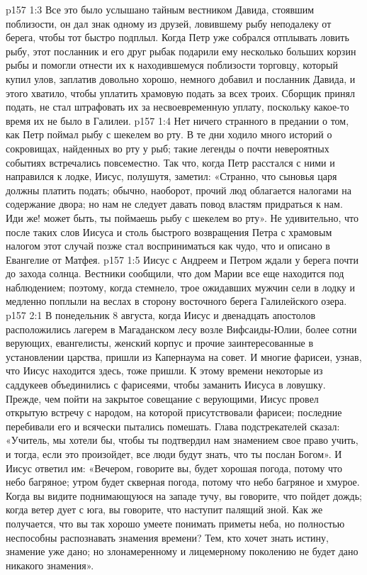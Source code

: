 \vs p157 1:3 Все это было услышано тайным вестником Давида, стоявшим поблизости, он дал знак одному из друзей, ловившему рыбу неподалеку от берега, чтобы тот быстро подплыл. Когда Петр уже собрался отплывать ловить рыбу, этот посланник и его друг рыбак подарили ему несколько больших корзин рыбы и помогли отнести их к находившемуся поблизости торговцу, который купил улов, заплатив довольно хорошо, немного добавил и посланник Давида, и этого хватило, чтобы уплатить храмовую подать за всех троих. Сборщик принял подать, не стал штрафовать их за несвоевременную уплату, поскольку какое\hyp{}то время их не было в Галилеи.
\vs p157 1:4 Нет ничего странного в предании о том, как Петр поймал рыбу с шекелем во рту. В те дни ходило много историй о сокровищах, найденных во рту у рыб; такие легенды о почти невероятных событиях встречались повсеместно. Так что, когда Петр расстался с ними и направился к лодке, Иисус, полушутя, заметил: «Странно, что сыновья царя должны платить подать; обычно, наоборот, прочий люд облагается налогами на содержание двора; но нам не следует давать повод властям придраться к нам. Иди же! может быть, ты поймаешь рыбу с шекелем во рту». Не удивительно, что после таких слов Иисуса и столь быстрого возвращения Петра с храмовым налогом этот случай позже стал восприниматься как чудо, что и описано в Евангелие от Матфея.
\vs p157 1:5 Иисус с Андреем и Петром ждали у берега почти до захода солнца. Вестники сообщили, что дом Марии все еще находится под наблюдением; поэтому, когда стемнело, трое ожидавших мужчин сели в лодку и медленно поплыли на веслах в сторону восточного берега Галилейского озера.
\vs p157 2:1 В понедельник 8 августа, когда Иисус и двенадцать апостолов расположились лагерем в Магаданском лесу возле Вифсаиды\hyp{}Юлии, более сотни верующих, евангелисты, женский корпус и прочие заинтересованные в установлении царства, пришли из Капернаума на совет. И многие фарисеи, узнав, что Иисус находится здесь, тоже пришли. К этому времени некоторые из саддукеев объединились с фарисеями, чтобы заманить Иисуса в ловушку. Прежде, чем пойти на закрытое совещание с верующими, Иисус провел открытую встречу с народом, на которой присутствовали фарисеи; последние перебивали его и всячески пытались помешать. Глава подстрекателей сказал: «Учитель, мы хотели бы, чтобы ты подтвердил нам знамением свое право учить, и тогда, если это произойдет, все люди будут знать, что ты послан Богом». И Иисус ответил им: «Вечером, говорите вы, будет хорошая погода, потому что небо багряное; утром будет скверная погода, потому что небо багряное и хмурое. Когда вы видите поднимающуюся на западе тучу, вы говорите, что пойдет дождь; когда ветер дует с юга, вы говорите, что наступит палящий зной. Как же получается, что вы так хорошо умеете понимать приметы неба, но полностью неспособны распознавать знамения времени? Тем, кто хочет знать истину, знамение уже дано; но злонамеренному и лицемерному поколению не будет дано никакого знамения».
